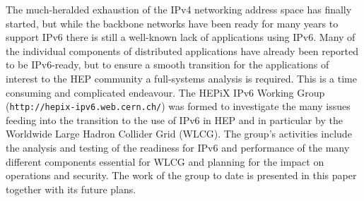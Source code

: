 The much-heralded exhaustion of the IPv4 networking address space has finally started,
but while the backbone networks have been ready for many years to support IPv6 there is still a well-known lack of 
applications using IPv6.
Many of the individual components of distributed applications have already been reported to be IPv6-ready,
but to ensure a smooth transition for the applications of interest to the HEP community a full-systems analysis 
is required. This is a time consuming and complicated endeavour.
The HEPiX IPv6 Working Group ({\tt http://hepix-ipv6.web.cern.ch/}) was formed to investigate the many issues feeding into the 
transition to the use of IPv6 in HEP and in particular by the Worldwide Large Hadron Collider Grid (WLCG). 
The group's activities include the analysis and testing of the readiness for IPv6 and 
performance of the many different components essential for WLCG and planning for the impact on 
operations and security. The work of the group to date is presented in this paper together with its future plans.
